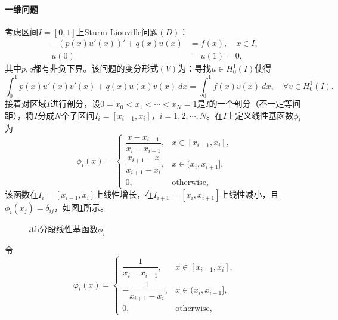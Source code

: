 \documentclass[a4paper,10pt]{ctexart}
\begin{document}
\paragraph*{一维问题}
考虑区间$ I = [0,1] $上Sturm-Liouville问题$ (D) $：
\begin{equation}
    \begin{aligned}
        -(p(x)u'(x))'+q(x)u(x) &= f(x),\quad x\in I,\\
        u(0) &= u(1) = 0,
    \end{aligned}
\end{equation}
其中$ p,q $都有非负下界。该问题的变分形式$ (V) $为：寻找$ u\in H^1_0(I) $使得
\begin{equation}
    \int_0^1 p(x)u'(x)v'(x) + q(x)u(x)v(x)\ d x = \int_0^1 f(x)v(x)\ d x,\quad \forall v\in H^1_0(I).
\end{equation}
接着对区域$ I $进行剖分，设$ 0 = x_0 < x_1 < \cdots < x_N = 1 $是$ I $的一个剖分（不一定等间距），将$ I $分成$ N $个子区间$ I_i = [x_{i-1},x_i] $，$ i = 1,2,\cdots ,N $。在$ I $上定义线性基函数$ \phi_i $为
\begin{equation}
    \phi_i(x) = \begin{cases}
        \dfrac{x-x_{i-1}}{x_i-x_{i-1}}, & x\in [x_{i-1},x_i],\\
        \dfrac{x_{i+1}-x}{x_{i+1}-x_i}, & x\in (x_i,x_{i+1}],\\
        0, & \text{otherwise},
    \end{cases}
\end{equation}
该函数在$ I_i=[x_{i-1},x_i] $上线性增长，在$ I_{i+1}=[x_i,x_{i+1}] $上线性减小，且$ \phi_i(x_j)=\delta_{ij} $，如图\ref{fig:linear_basis}所示。
\begin{figure}[htpb]
    \centering
    \caption{$ i $th分段线性基函数$ \phi_i $}
    \label{fig:linear_basis}
\end{figure}
\newline
令
\[
    \varphi_i(x) = 
    \begin{cases}
        \dfrac{1}{x_i-x_{i-1}}, & x\in [x_{i-1},x_i],\\
        -\dfrac{1}{x_{i+1}-x_i}, & x\in (x_i,x_{i+1}],\\
        0, & \text{otherwise},
    \end{cases}
\]
\end{document}
